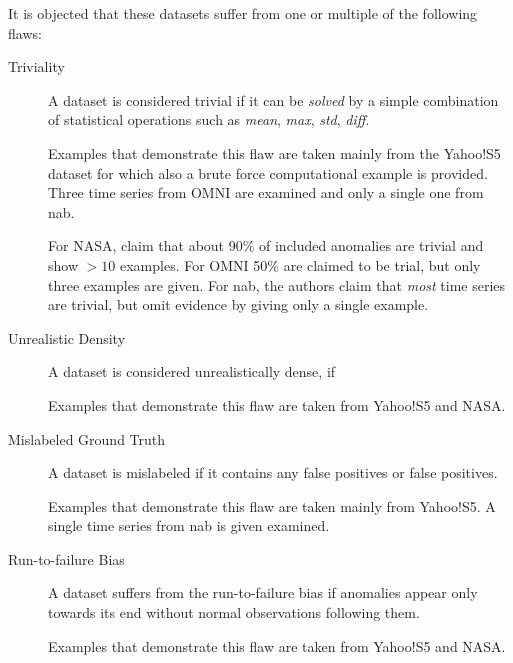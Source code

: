 It is objected that these datasets suffer from one or multiple of the following
flaws:
\begin{description}
    \item[Triviality] A dataset is considered trivial if it can be \textit{solved}
    by a simple combination of statistical operations such as \textit{mean},
    \textit{max}, \textit{std}, \textit{diff}.
    
    Examples that demonstrate this flaw are taken mainly from the Yahoo!S5 dataset
    for which also a brute force computational example is provided. Three time series
    from OMNI are examined and only a single one from \gls{nab}.
    
    For NASA, \textcite{Renjie.2020} claim that about 90\% of included anomalies
    are trivial and show \(>10\) examples. For OMNI 50\% are claimed to be trial,
    but only three examples are given. For \gls{nab}, the authors claim that
    \textit{most} time series are trivial, but omit evidence by giving only a
    single example.

    \item[Unrealistic Density] A dataset is considered unrealistically dense, if

    Examples that demonstrate this flaw are taken from Yahoo!S5 and NASA\@.

    \item[Mislabeled Ground Truth] A dataset is mislabeled if it contains any
    false positives or false positives.

    Examples that demonstrate this flaw are taken mainly from Yahoo!S5. A single
    time series from \gls{nab} is given examined.

    \item[Run-to-failure Bias] A dataset suffers from the run-to-failure bias if
    anomalies appear only towards its end without normal observations following
    them.

    Examples that demonstrate this flaw are taken from Yahoo!S5 and NASA\@.
\end{description}

